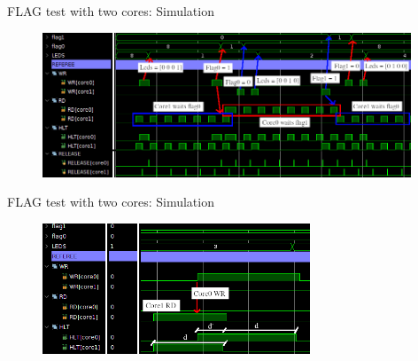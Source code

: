 \begin{frame}{FLAG test with two cores: Simulation}
\begin{figure}
    \centering
    \includegraphics[width=11cm]{images/flag2_sim_crop_arrows.png}
    \label{fig:my_label}
\end{figure}
\end{frame}


\begin{frame}{FLAG test with two cores: Simulation}
\begin{figure}
    \centering
    \includegraphics[width=8cm]{images/flag2_sim_close_arrow.png}
    \label{fig:my_label2}
\end{figure}
\end{frame}

